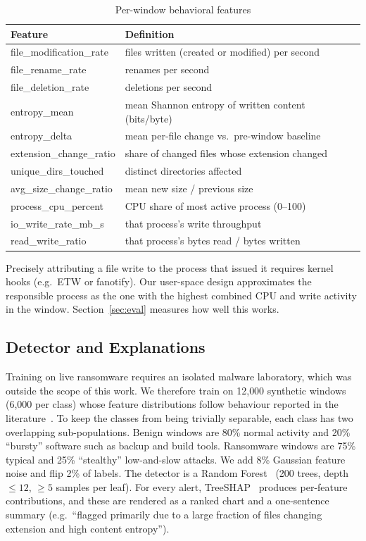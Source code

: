 \documentclass[conference]{IEEEtran}
\begin{document}
\begin{table}[t]
\caption{Per-window behavioral features}
\label{tab:features}
\centering
\footnotesize
\begin{tabular}{@{}ll@{}}
\toprule
Feature & Definition \\
\midrule
file\_modification\_rate & files written (created or modified) per second \\
file\_rename\_rate & renames per second \\
file\_deletion\_rate & deletions per second \\
entropy\_mean & mean Shannon entropy of written content (bits/byte) \\
entropy\_delta & mean per-file change vs.\ pre-window baseline \\
extension\_change\_ratio & share of changed files whose extension changed \\
unique\_dirs\_touched & distinct directories affected \\
avg\_size\_change\_ratio & mean new size / previous size \\
process\_cpu\_percent & CPU share of most active process (0--100) \\
io\_write\_rate\_mb\_s & that process's write throughput \\
read\_write\_ratio & that process's bytes read / bytes written \\
\bottomrule
\end{tabular}
\end{table}

Precisely attributing a file write to the process that issued it requires kernel hooks (e.g.\ ETW or fanotify). Our user-space design approximates the responsible process as the one with the highest combined CPU and write activity in the window. Section~\ref{sec:eval} measures how well this works.

\subsection{Detector and Explanations}
Training on live ransomware requires an isolated malware laboratory, which was outside the scope of this work. We therefore train on 12{,}000 synthetic windows (6{,}000 per class) whose feature distributions follow behaviour reported in the literature~\cite{hirano2019storage,urooj2022survey,vehabovic2022strategies}. To keep the classes from being trivially separable, each class has two overlapping sub-populations. Benign windows are 80\% normal activity and 20\% ``bursty'' software such as backup and build tools. Ransomware windows are 75\% typical and 25\% ``stealthy'' low-and-slow attacks. We add 8\% Gaussian feature noise and flip 2\% of labels. The detector is a Random Forest~\cite{breiman2001rf} (200 trees, depth $\le 12$, $\ge 5$ samples per leaf). For every alert, TreeSHAP~\cite{lundberg2020treeshap} produces per-feature contributions, and these are rendered as a ranked chart and a one-sentence summary (e.g.\ ``flagged primarily due to a large fraction of files changing extension and high content entropy'').
\end{document}
